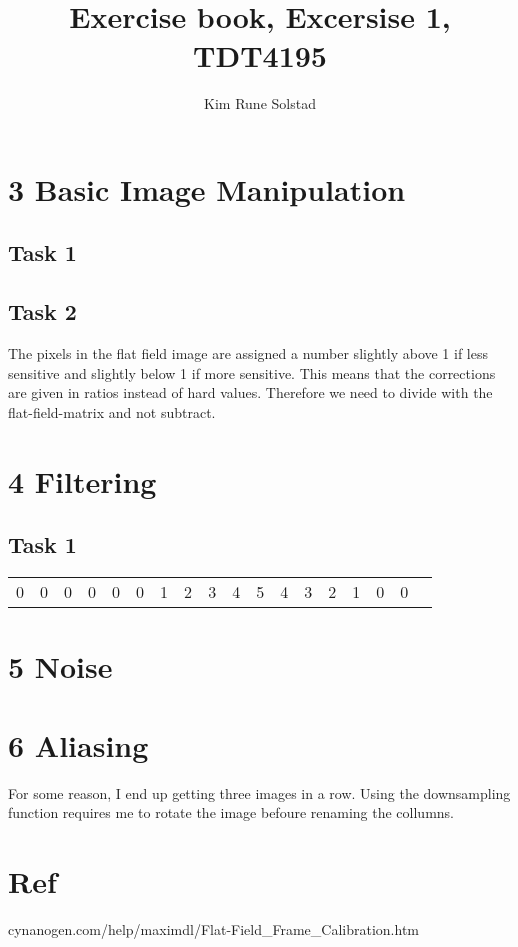 \documentclass{article}
\title{Exercise book, Excersise 1, TDT4195}
\author{Kim Rune Solstad}
\begin{document}
\lstset{language=Matlab}

\maketitle

\section*{3 Basic Image Manipulation}
\subsection*{Task 1}

\subsection*{Task 2}
The pixels in the flat field image are assigned a number slightly above 1 if less sensitive and slightly below 1 if more sensitive. This means that the corrections are given in ratios instead of hard values. Therefore we need to divide with the flat-field-matrix and not subtract.

\section*{4 Filtering}
\subsection*{Task 1}

\begin{tabular}{|c|*{16}{c|}r}
0&0&0&0&0&0& 1&2&3&4&5&4&3&2&1&0&0
\end{tabular}

\section*{5 Noise}


\section*{6 Aliasing}

For some reason, I end up getting three images in a row. Using the downsampling function requires me to rotate the image befoure renaming the collumns.


\section*{Ref}
cynanogen.com/help/maximdl/Flat-Field\_Frame\_Calibration.htm
\end{document}
